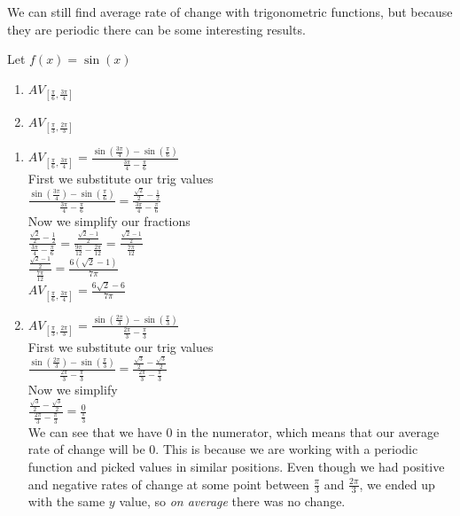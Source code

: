 \documentclass{ximera}
\begin{document}
We can still find average rate of change with trigonometric functions, but because they are periodic there can be some interesting results.

\begin{example}
Let $f(x) =\sin(x)$
\begin{enumerate}
\item $AV_{[\frac{\pi}{6},\frac{3\pi}{4}]} $
\item $AV_{[\frac{\pi}{3},\frac{2\pi}{3}]} $
\end{enumerate}
\begin{explanation}
\begin{enumerate}
\item $AV_{[\frac{\pi}{6},\frac{3\pi}{4}]}  = \frac{\sin(\frac{3\pi}{4})-\sin(\frac{\pi}{6})}{\frac{3\pi}{4} - \frac{\pi}{6}}$\\
First we substitute our trig values\\
$\frac{\sin(\frac{3\pi}{4})-\sin(\frac{\pi}{6})}{\frac{3\pi}{4} - \frac{\pi}{6}}=\frac{\frac{\sqrt{2}}{2}-\frac{1}{2}}{\frac{3\pi}{4} - \frac{\pi}{6}}$\\
Now we simplify our fractions\\
$\frac{\frac{\sqrt{2}}{2}-\frac{1}{2}}{\frac{3\pi}{4} - \frac{\pi}{6}}= \frac{\frac{\sqrt{2}-1}{2}}{\frac{9\pi}{12} - \frac{2\pi}{12}}= \frac{\frac{\sqrt{2}-1}{2}}{\frac{7\pi}{12}}$\\
$\frac{\frac{\sqrt{2}-1}{2}}{\frac{7\pi}{12}}=\frac{6(\sqrt{2}-1)}{7\pi}$\\
$AV_{[\frac{\pi}{6},\frac{3\pi}{4}]} =\frac{6\sqrt{2}-6}{7\pi}$

\item $AV_{[\frac{\pi}{3},\frac{2\pi}{3}]} = \frac{\sin(\frac{2\pi}{3})-\sin(\frac{\pi}{3})}{\frac{2\pi}{3} - \frac{\pi}{3}}$\\
First we substitute our trig values\\
$\frac{\sin(\frac{2\pi}{3})-\sin(\frac{\pi}{3})}{\frac{2\pi}{3} - \frac{\pi}{3}} = \frac{\frac{\sqrt{3}}{2}-\frac{\sqrt{3}}{2}}{\frac{2\pi}{3} - \frac{\pi}{3}}$\\
Now we simplify\\
$\frac{\frac{\sqrt{3}}{2}-\frac{\sqrt{3}}{2}}{\frac{2\pi}{3} - \frac{\pi}{3}}=\frac{0}{\frac{\pi}{3}}$\\
We can see that we have $0$ in the numerator, which means that our average rate of change will be $0$. This is because we are working with a periodic function and picked values in similar positions. Even though we had positive and negative rates of change at some point between $\frac{\pi}{3}$ and $\frac{2\pi}{3}$, we ended up with the same $y$ value, so \textit{on average} there was no change.
\end{enumerate}
\end{explanation}
\end{example}
\end{document}
